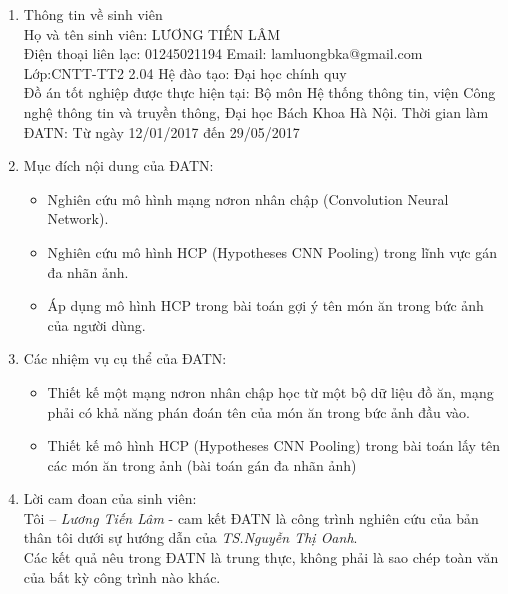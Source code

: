 \documentclass[13pt, a4paper]{extreport}
\begin{document}
\begin{enumerate}
  \fontsize{13pt}{15.6}\selectfont
  \item Thông tin về sinh viên \\
   Họ và tên sinh viên: LƯƠNG TIẾN LÂM \\
   Điện thoại liên lạc: 01245021194 \hspace{2cm} Email: lamluongbka@gmail.com \\
   Lớp:CNTT-TT2 2.04 \hspace{4.28cm} Hệ đào tạo: Đại học chính quy \\
   Đồ án tốt nghiệp được thực hiện tại: Bộ môn Hệ thống thông tin, viện Công nghệ thông tin và truyền thông, Đại học Bách Khoa Hà Nội.
  Thời gian làm ĐATN: Từ ngày 12/01/2017 đến 29/05/2017
  \item Mục đích nội dung của ĐATN:
  \begin{itemize}
    \item Nghiên cứu mô hình mạng nơron nhân chập (Convolution Neural Network).
    \item Nghiên cứu mô hình HCP (Hypotheses CNN Pooling) trong lĩnh vực gán đa nhãn ảnh.
    \item Áp dụng mô hình HCP trong bài toán gợi ý tên món ăn trong bức ảnh của người dùng.
  \end{itemize}
  \item Các nhiệm vụ cụ thể của ĐATN:
    \begin{itemize}
    \item Thiết kế một mạng nơron nhân chập học từ một bộ dữ liệu đồ ăn, mạng phải có khả năng phán đoán tên của món ăn trong bức ảnh đầu vào.
    \item Thiết kế mô hình HCP (Hypotheses CNN Pooling) trong bài toán lấy tên các món ăn trong ảnh (bài toán gán đa nhãn ảnh)
  \end{itemize}
  \item Lời cam đoan của sinh viên:\\
   Tôi – \textit{Lương Tiến Lâm} - cam kết ĐATN là công trình nghiên cứu của bản thân tôi dưới sự hướng dẫn của \textit{TS.Nguyễn Thị Oanh}. \\
   Các kết quả nêu trong ĐATN là trung thực, không phải là sao chép toàn văn của bất kỳ công trình nào khác.
  \begin{flushleft}
    {\fontsize{13pt}{15.6pt}}
\end{flushleft}
\end{enumerate}
\end{document}
